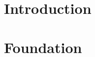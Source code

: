 \documentclass{mimosis}
\title{\texttt{\getTitleEng}}
\subtitle{\texttt{\getTitleGer}}
\author{\getAuthor{}}
\begin{document}
\frontmatter





\tableofcontents

\mainmatter

\part[Introduction]{%
	Introduction\\
	\vspace{1cm}
}\label{part:introduction}



\part[Foundation]{%
	Foundation\\
	\vspace{1cm}
}\label{part:foundation}



\end{document}
